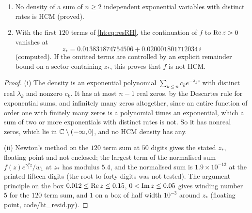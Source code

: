 \begin{theorem}[No HCM]\label{ht:thm:nohcm}
\begin{enumerate}
\item[(i)] No density of a sum of $n\ge2$ independent exponential variables with distinct rates is HCM (proved).
\item[(ii)] With the first $120$ terms of \eqref{ht:eq:resRH}, the continuation of $f$ to $\operatorname{Re} z>0$ vanishes at
\[
z_*=0.013831874754506+0.020001801712034\,i
\]
(computed). If the omitted terms are controlled by an explicit remainder bound on a sector containing $z_*$, this proves that $f$ is not HCM.
\end{enumerate}
\end{theorem}

\begin{proof}
(i) The density is an exponential polynomial $\sum_{k\le n}c_ke^{-\lambda_kz}$ with distinct real $\lambda_k$ and nonzero $c_k$. It has at most $n-1$ real zeros, by the Descartes rule for exponential sums, and infinitely many zeros altogether, since an entire function of order one with finitely many zeros is a polynomial times an exponential, which a sum of two or more exponentials with distinct rates is not. So it has nonreal zeros, which lie in $\mathbb{C}\setminus(-\infty,0]$, and no HCM density has any.

(ii) Newton's method on the $120$ term sum at $50$ digits gives the stated $z_*$, floating point and not enclosed; the largest term of the normalised sum $f(z)e^{\gamma_1^2z}/w_1$ at $z_*$ has modulus $5.4$, and the normalised sum is $1.9\times10^{-12}$ at the printed fifteen digits (the root to forty digits was not tested). The argument principle on the box $0.012\le\operatorname{Re} z\le0.15$, $0<\operatorname{Im} z\le0.05$ gives winding number $5$ for the $120$ term sum, and $1$ on a box of half width $10^{-3}$ around $z_*$ (floating point, code/ht\_resid.py).
\end{proof}

